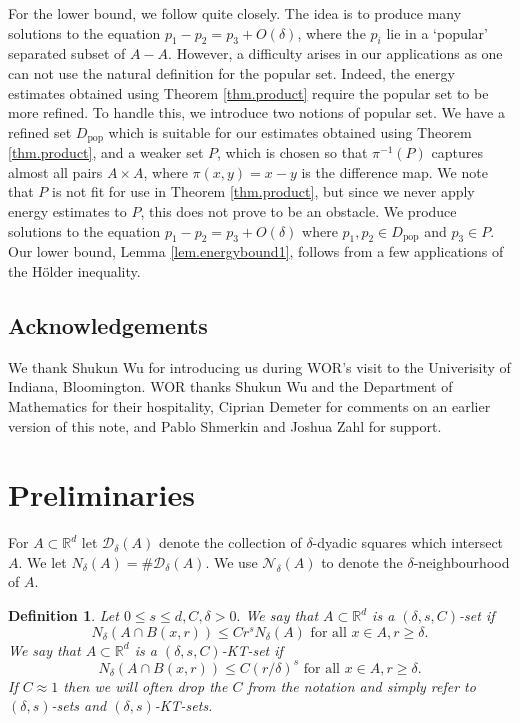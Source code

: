 \documentclass[12pt]{amsart}
\newtheorem{definition}[theorem]{Definition}
\newcommand{\R}{\mathbb{R}}\newcommand{\C}{\mathbb{C}}
\newcommand{\cD}{\mathcal{D}}
\newcommand{\cN}{\mathcal{N}}
\newcommand{\dy}[2]{\cD_{#1}(#2)}
\newcommand{\1}{\mathbf{1}}
\newcommand{\de}{\delta}
\newcommand{\cn}[1]{N_\de({#1})}
\begin{document}
For the lower bound, we follow \cite{csumproduct} quite closely.
The idea is to produce many solutions to the equation \(p_1 - p_2 = p_3 + O(\delta)\), where the \(p_{i}\)
lie in  a `popular' separated subset of \(A-A\). However, a difficulty arises in our applications
as one can not use the natural definition for the popular set. Indeed, 
the energy estimates obtained using Theorem \ref{thm.product} require the popular set
to be more refined.
To handle this, we introduce two notions of popular set. We have a refined set \(D_{\text{pop}} \)
which is suitable for our estimates obtained using Theorem \ref{thm.product}, and a weaker set \(P\),
which is chosen so that \(\pi ^{-1} (P)\) captures almost all pairs \(A \times A\), where \(\pi(x,y) = x-y\) is
the difference map. We note that \(P\) is not
fit for use in Theorem \ref{thm.product}, but since we never apply energy estimates to \(P\), this does not
prove to be an obstacle. 
We produce solutions
to the equation \(p_1 - p_2 = p_3 + O(\delta)\) where \(p_1,p_2 \in D_{\text{pop}} \) and \(p_3 \in  P\).
Our lower bound, Lemma \ref{lem.energybound1}, follows from a few applications of the H\"older inequality.
\subsection*{Acknowledgements} We thank Shukun Wu for introducing us during WOR's visit to the Univerisity of Indiana, Bloomington. WOR thanks Shukun Wu and the Department of Mathematics for their hospitality, Ciprian Demeter for comments on an earlier version of this note, and Pablo Shmerkin and Joshua Zahl for support. 


	\section{Preliminaries}
    For $A \subset \R^d$ let $\dy\de A$ denote the collection of $\de$-dyadic squares which intersect $A.$ We let $N_\de(A) = \# \dy \de A.$ We use $\cN_\de(A)$ to denote the $\de$-neighbourhood of $A.$ 
	\begin{definition}
		Let $0 \leq s \leq d, C, \delta >0.$ We say that $A \subset \R^d$ is a $(\delta,s,C)$-\textit{set} if 
		\begin{equation}
			\cn{A \cap B(x,r)} \leq Cr^s\cn{A}\text{ for all } x \in A, r \geq \delta.
		\end{equation}
		We say that $A \subset \R^d$ is a $(\delta,s,C)$-\textit{KT-set} if 
		\begin{equation}
			\cn{A \cap B(x,r)} \leq C(r/\delta)^s \text{ for all } x \in A, r \geq \delta.
		\end{equation}
		If $C \approx 1$ then we will often drop the $C$ from the notation and simply refer to $(\delta,s)$-sets and $(\de,s)$-KT-sets.
	\end{definition}
    
\end{document}
